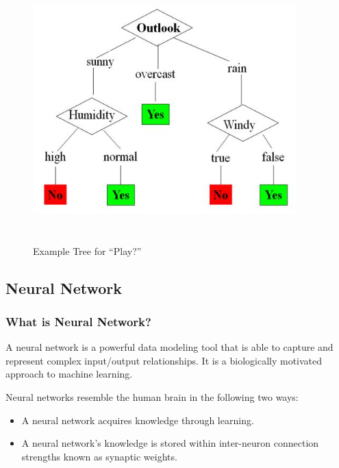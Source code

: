 \documentclass[a4paper,14pt,onecolumn]{article}
\begin{document}
\begin{figure}
\begin{center}
\includegraphics[height=4in,width=4in]
{decisiontree.jpg}  
\caption{Example Tree for “Play?”}
\end{center}
\end{figure} 

\subsection{Neural Network}

  \subsubsection{What is Neural Network?}
              A neural network is a powerful data modeling tool that is able to capture and represent complex input/output relationships. It is a biologically motivated approach to machine learning.


Neural networks resemble the human brain in the following two ways: 
 \begin{itemize}	
\item A neural network acquires knowledge through learning. 
\item A neural network's knowledge is stored within inter-neuron connection strengths known as synaptic weights.
\end{itemize}
\end{document}
